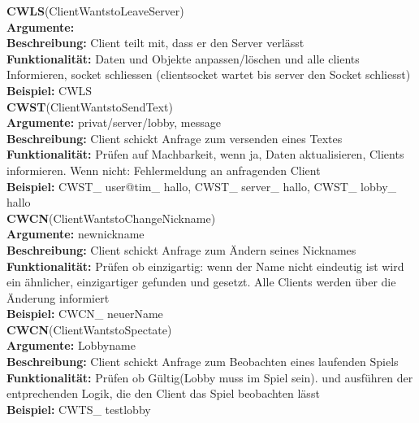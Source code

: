 \documentclass[a4paper, 12pt, oneside, headsepline=.5pt,footsepline=.5pt]{scrartcl}
\begin{document}
{\large \textbf{CWLS}(ClientWantstoLeaveServer)} \\
\hspace{4ex} \textbf{Argumente:} {} \\
\hspace{4ex} \textbf{Beschreibung:} {Client teilt mit, dass er den Server verlässt} \\
\hspace{4ex} \textbf{Funktionalität:} {Daten und Objekte anpassen/löschen und alle clients Informieren, socket schliessen (clientsocket wartet bis server den Socket schliesst)} \\
\hspace{4ex} \textbf{Beispiel:} {CWLS} \\

{\large \textbf{CWST}(ClientWantstoSendText)} \\
\hspace{4ex} \textbf{Argumente:} {privat/server/lobby, message} \\
\hspace{4ex} \textbf{Beschreibung:} {Client schickt Anfrage zum versenden eines Textes} \\
\hspace{4ex} \textbf{Funktionalität:} {Prüfen auf Machbarkeit, wenn ja, Daten aktualisieren, Clients informieren. Wenn nicht: Fehlermeldung an anfragenden Client} \\
\hspace{4ex} \textbf{Beispiel:} {CWST\_ user@tim\_ hallo, CWST\_ server\_ hallo, CWST\_ lobby\_ hallo} \\

{\large \textbf{CWCN}(ClientWantstoChangeNickname)} \\
\hspace{4ex} \textbf{Argumente:} {newnickname} \\
\hspace{4ex} \textbf{Beschreibung:} {Client schickt Anfrage zum Ändern seines Nicknames} \\
\hspace{4ex} \textbf{Funktionalität:} {Prüfen ob einzigartig: wenn der Name nicht eindeutig ist wird ein ähnlicher, einzigartiger gefunden und gesetzt. Alle Clients werden über die Änderung informiert} \\
\hspace{4ex} \textbf{Beispiel:} {CWCN\_ neuerName} \\

{\large \textbf{CWCN}(ClientWantstoSpectate)} \\
\hspace{4ex} \textbf{Argumente:} {Lobbyname} \\
\hspace{4ex} \textbf{Beschreibung:} {Client schickt Anfrage zum Beobachten eines laufenden Spiels} \\
\hspace{4ex} \textbf{Funktionalität:} {Prüfen ob Gültig(Lobby muss im Spiel sein). und ausführen der entprechenden Logik, die den Client das Spiel beobachten lässt} \\
\hspace{4ex} \textbf{Beispiel:} {CWTS\_ testlobby} \\
\end{document}
